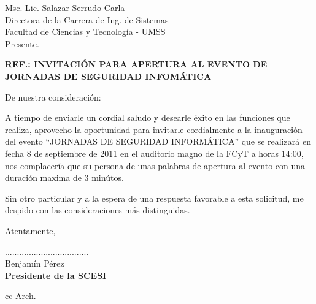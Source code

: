 \documentclass[letterpaper,12pt]{letter}
\begin{document}
\date {6 de septiembre de 2011}
\begin{letter}{Msc. Lic. Salazar Serrudo Carla \\ Directora de la Carrera de Ing. de Sistemas \\ Facultad de Ciencias y Tecnolog\'ia - UMSS \\ \underline {Presente}. -}
\begin{center}
	\opening{\textbf{REF.: INVITACI\'ON PARA APERTURA AL EVENTO DE JORNADAS DE SEGURIDAD INFOM\'ATICA}}
\end{center}

De nuestra consideración:

A tiempo de enviarle un cordial saludo y desearle éxito en las funciones que realiza, aprovecho la oportunidad para invitarle 
cordialmente a la inauguraci\'on del evento ``JORNADAS DE SEGURIDAD INFORMÁTICA'' que se realizar\'a en fecha 8 de septiembre 
de 2011 en el auditorio magno de la FCyT a horas 14:00, nos complacer\'ia que su persona de unas palabras de apertura al evento 
con una duraci\'on maxima de 3 min\'utos.
             
Sin otro particular y a la espera de una respuesta favorable a esta solicitud, me despido con las consideraciones más distinguidas.

Atentamente,

\vspace{5cm}

\begin{center}
...................................\\
Benjam\'in P\'erez\\
{\bfseries Presidente de la  SCESI}
\end{center}
\vspace{2cm}
cc Arch.
\end{letter}
\end{document}
